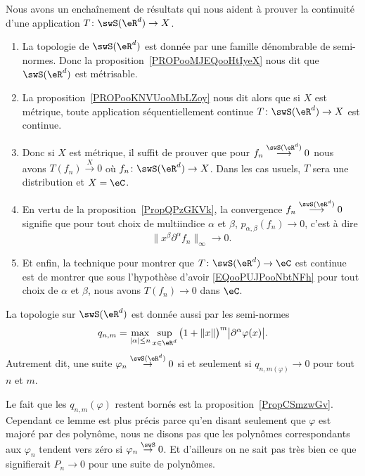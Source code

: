 \begin{normaltext}      \label{NORMooVQESooRwJShl}
Nous avons un enchaînement de résultats qui nous aident à prouver la continuité d'une application \( T\colon \swS(\eR^d)\to X\).
\begin{enumerate}
    \item
        La topologie de \( \swS(\eR^d)\) est donnée par une famille dénombrable de semi-normes. Donc la proposition~\ref{PROPooMJEQooHtIyeX} nous dit que \( \swS(\eR^d)\) est métrisable.
    \item
        La proposition~\ref{PROPooKNVUooMbLZoy} nous dit alors que si \( X\) est métrique, toute application séquentiellement continue \( T\colon \swS(\eR^d)\to X\) est continue.
    \item
        Donc si \( X\) est métrique, il suffit de prouver que pour \( f_n\stackrel{\swS(\eR^d)}{\longrightarrow}0\) nous avons \( T(f_n)\stackrel{X}{\longrightarrow} 0\) où \( f_n\colon \swS(\eR^d)\to X\). Dans les cas usuels, \( T\) sera une distribution et \( X=\eC\).
    \item
        En vertu de la proposition~\ref{PropQPzGKVk}, la convergence \( f_n\stackrel{\swS(\eR^d)}{\longrightarrow}0\) signifie que pour tout choix de multiindice \( \alpha\) et \( \beta\),  \( p_{\alpha,\beta}(f_n)\to 0\), c'est à dire
        \begin{equation}        \label{EQooPUJPooNbtNFh}
            \| x^{\beta}\partial^{\alpha}f_n \|_{\infty}\to 0.
        \end{equation}
    \item
        Et enfin, la technique pour montrer que \( T\colon \swS(\eR^d)\to \eC\) est continue est de montrer que sous l'hypothèse d'avoir \eqref{EQooPUJPooNbtNFh} pour tout choix de \( \alpha\) et \( \beta\), nous avons \( T(f_n)\to 0\) dans \( \eC\).
\end{enumerate}
\end{normaltext}

\begin{lemma}   \label{LemRJhCbkO}
    La topologie sur \( \swS(\eR^d)\) est donnée aussi par les semi-normes
    \begin{equation}
        q_{n,m}=\max_{| \alpha |\leq n}\sup_{x\in \eR^d}\big( 1+\| x \| \big)^m\big| \partial^{\alpha}\varphi(x) \big|.
    \end{equation}
    Autrement dit, une suite \( \varphi_n\stackrel{\swS(\eR^d)}{\to}0\) si et seulement si \( q_{n,m(\varphi)}\to 0\) pour tout \( n\) et \( m\).
\end{lemma}
Le fait que les \( q_{n,m}(\varphi)\) restent bornés est la proposition~\ref{PropCSmzwGv}. Cependant ce lemme est plus précis parce qu'en disant seulement que \( \varphi\) est majoré par des polynôme, nous ne disons pas que les polynômes correspondants aux \( \varphi_n\) tendent vers zéro si \( \varphi_n\stackrel{\swS}{\to}0\). Et d'ailleurs on ne sait pas très bien ce que signifierait \( P_n\to 0\) pour une suite de polynômes.

